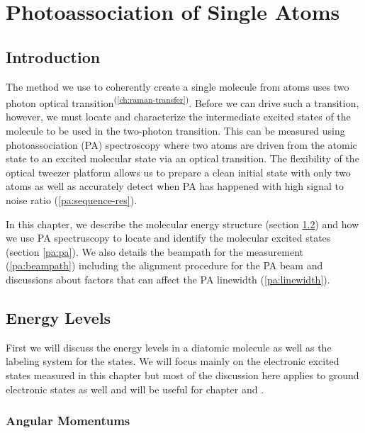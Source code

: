 
\chapter{Photoassociation of Single Atoms}
\label{ch:pa}

\section{Introduction}

The method we use to coherently create a single molecule from atoms
uses two photon optical transition\textsuperscript{(\ref{ch:raman-transfer})}.
Before we can drive such a transition, however, we must locate and characterize
the intermediate excited states of the molecule to be used in the two-photon transition.
This can be measured using photoassociation (PA) spectroscopy
where two atoms are driven from the atomic state to an excited molecular state
via an optical transition.
The flexibility of the optical tweezer platform allows us to
prepare a clean initial state with only two atoms
as well as accurately detect when PA has happened
with high signal to noise ratio (\ref{pa:sequence-res}).

In this chapter, we describe the molecular energy structure (section \ref{pa:structure})
and how we use PA spectruscopy to locate and identify the molecular excited states
(section \ref{pa:pa}).
We also details the beampath for the measurement (\ref{pa:beampath}) including
the alignment procedure for the PA beam and discussions about factors that can affect
the PA linewidth (\ref{pa:linewidth}).

\section{Energy Levels}
\label{pa:structure}

First we will discuss the energy levels in a diatomic molecule
as well as the labeling system for the states.
We will focus mainly on the electronic excited states measured in this chapter
but most of the discussion here applies to ground electronic states as well
and will be useful for chapter \label{ch:raman-spectroscopy} and \label{ch:raman-transfer}.

\subsection{Angular Momentums}

